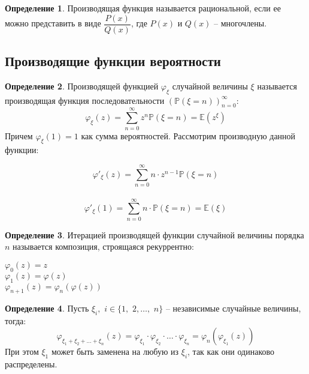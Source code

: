\documentclass[12pt]{article}
\theoremstyle{definition}
\newtheorem{definition}{Определение}
\newcommand{\E}{\mathbb{E}}
\newcommand{\prob}{\mathbb{P}}
\begin{document}
\begin{definition}
    Производящая функция называется рациональной, если ее можно представить в виде $\dfrac{P(x)}{Q(x)}$, где $P(x)$ и $Q(x)$ – многочлены.
\end{definition}

\subsection{Производящие функции вероятности}

\begin{definition}
    Производящей функцией $\varphi_\xi$ случайной величины $\xi$ называется производящая функция последовательности $\left(\prob(\xi=n)\right)^\infty_{n=0}$:
    $$\varphi_\xi(z)=\sum_{n=0}^{\infty}z^n\prob(\xi=n)=\E(z^\xi)$$
    Причем $\varphi_\xi(1)=1$ как сумма вероятностей. Рассмотрим производную данной функции:
    \begin{multicols}{2}
        \centering
        \[\varphi'_\xi(z)=\sum_{n=0}^\infty n\cdot z^{n-1}\prob(\xi=n)\]\\
        \[\varphi'_\xi(1)=\sum_{n=0}^\infty n\cdot \prob(\xi=n)=\E(\xi)\]
    \end{multicols}
\end{definition}
\begin{definition}
    Итерацией производящей функции случайной величины порядка $n$ называется композиция, строящаяся рекуррентно:
    \begin{multicols}{3}
        \centering
        $\varphi_0(z)=z$\\
        $\varphi_1(z)=\varphi(z)$\\
        $\varphi_{n+1}(z)=\varphi_n(\varphi(z))$
    \end{multicols}
\end{definition}
\begin{definition}
    Пусть $\xi_i,\,\,i\in\{1,\,\,2,\ldots,\,\,n\}$ – независимые случайные величины, тогда:
    $$\varphi_{\xi_1+\xi_2+\ldots+\xi_n}(z)=\varphi_{\xi_1}\cdot\varphi_{\xi_2}\cdot\ldots\cdot\varphi_{\xi_n}=\varphi_n(\varphi_{\xi_1}(z))$$
    При этом $\xi_1$ может быть заменена на любую из $\xi_i$, так как они одинаково распределены.
\end{definition}
\end{document}
